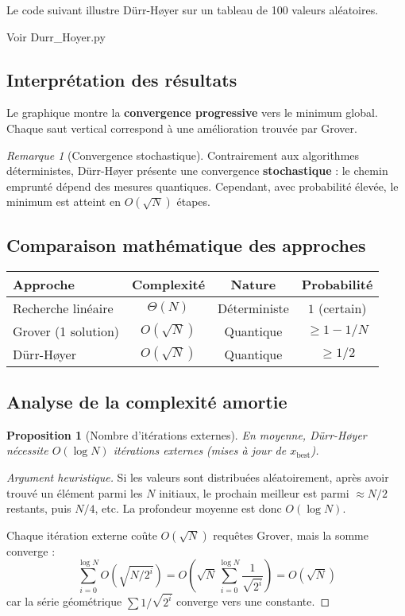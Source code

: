 \documentclass[12pt,a4paper]{article}
\newtheorem{proposition}[theorem]{Proposition}
\theoremstyle{definition}
\theoremstyle{remark}
\newtheorem{remark}[theorem]{Remarque}
\begin{document}
Le code suivant illustre Dürr-Høyer sur un tableau de 100 valeurs aléatoires.

Voir Durr\_Hoyer.py

\newpage

\subsection{Interprétation des résultats}

Le graphique montre la \textbf{convergence progressive} vers le minimum global. Chaque saut vertical correspond à une amélioration trouvée par Grover.

\begin{remark}[Convergence stochastique]
Contrairement aux algorithmes déterministes, Dürr-Høyer présente une convergence \textbf{stochastique} : le chemin emprunté dépend des mesures quantiques. Cependant, avec probabilité élevée, le minimum est atteint en $O(\sqrt{N})$ étapes.
\end{remark}

\subsection{Comparaison mathématique des approches}

\begin{center}
\begin{tabular}{|l|c|c|c|}
\hline
\textbf{Approche} & \textbf{Complexité} & \textbf{Nature} & \textbf{Probabilité} \\
\hline
Recherche linéaire & $\Theta(N)$ & Déterministe & $1$ (certain) \\
Grover (1 solution) & $O(\sqrt{N})$ & Quantique & $\geq 1 - 1/N$ \\
Dürr-Høyer & $O(\sqrt{N})$ & Quantique & $\geq 1/2$ \\
\hline
\end{tabular}
\end{center}

\subsection{Analyse de la complexité amortie}

\begin{proposition}[Nombre d'itérations externes]
En moyenne, Dürr-Høyer nécessite $O(\log N)$ itérations externes (mises à jour de $x_{\text{best}}$).
\end{proposition}

\begin{proof}[Argument heuristique]
Si les valeurs sont distribuées aléatoirement, après avoir trouvé un élément parmi les $N$ initiaux, le prochain meilleur est parmi $\approx N/2$ restants, puis $N/4$, etc. La profondeur moyenne est donc $O(\log N)$.

Chaque itération externe coûte $O(\sqrt{N})$ requêtes Grover, mais la somme converge :
\[
\sum_{i=0}^{\log N} O\left(\sqrt{N/2^i}\right) = O\left(\sqrt{N} \sum_{i=0}^{\log N} \frac{1}{\sqrt{2^i}}\right) = O(\sqrt{N})
\]
car la série géométrique $\sum 1/\sqrt{2^i}$ converge vers une constante.
\end{proof}
\end{document}
